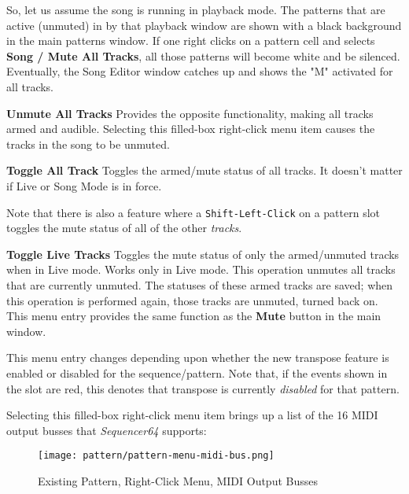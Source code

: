    So, let us assume the song is running in playback mode.  The patterns that
   are active (unmuted) in by that playback window are shown with a black
   background in the main patterns window.  If one right clicks on a pattern
   cell and selects \textbf{Song / Mute All Tracks}, all those patterns
   will become white and be silenced.  Eventually, the Song Editor window
   catches up and shows the "M" activated for all tracks.

   \textbf{Unmute All Tracks}
   Provides the opposite functionality, making all tracks armed and audible.
   Selecting this filled-box right-click menu item causes
   the tracks in the song to be unmuted.


   \textbf{Toggle All Track}
   Toggles the armed/mute status of all tracks.
   It doesn't matter if Live or Song Mode is in force.

   Note that there is also a feature where a
   \texttt{Shift-Left-Click} on a pattern slot toggles the mute
   status of all of the other \textsl{tracks}.

   \textbf{Toggle Live Tracks}
   Toggles the mute status of only the armed/unmuted tracks when in Live mode.
   Works only in Live mode.  This operation unmutes all tracks that are
   currently unmuted.  The statuses of these armed tracks are saved; when
   this operation is performed again, those tracks are unmuted, turned back on.
   This menu entry provides the same function as the \textbf{Mute}
   button in the main window.

   This menu entry changes depending upon whether the new transpose feature is
   enabled or disabled for the sequence/pattern.  Note that, if the events
   shown in the slot are red, this denotes that transpose is currently
   \textsl{disabled} for that pattern.

   Selecting this filled-box right-click menu item brings up a list
   of the 16 MIDI output busses that \textsl{Sequencer64} supports:

\begin{figure}[H]
   \centering 
   \texttt{[image: pattern/pattern-menu-midi-bus.png]}
   \caption{Existing Pattern, Right-Click Menu, MIDI Output Busses}
   \label{fig:pattern_window_right_click_midi_bus}
\end{figure}

